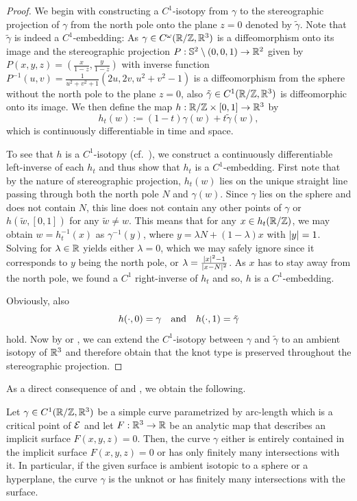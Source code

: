\begin{proof}
	We begin with constructing a $C^1$-isotopy from $\gamma$ to the stereographic projection of $\gamma$ from the north pole onto the plane $z=0$ denoted by $\tilde \gamma$. Note that $\tilde \gamma$ is indeed a $C^1$-embedding: As $\gamma\in C^\omega(\mathbb{R}/\mathbb{Z},\mathbb{R}^3)$ is a diffeomorphism onto its image and the stereographic projection $P:\mathbb S^2\setminus{(0,0,1)} \rightarrow \mathbb{R}^2$ given by $P(x,y,z)= (\frac{x}{1-z},\frac{y}{1-z})$ with inverse function $P^{-1}(u,v) = \tfrac{1}{u^2+v^2 +1}(2u,2v,u^2+v^2 -1)$ is a diffeomorphism from the sphere without the north pole to the plane $z=0$, also $\tilde \gamma \in C^1(\mathbb{R}/\mathbb{Z},\mathbb{R}^3)$ is diffeomorphic onto its image. We then define the map $h:\mathbb{R}/\mathbb{Z} \times [0,1]\rightarrow \mathbb{R}^3$ by
	\[
		h_t(w):=(1-t)\gamma(w) + t \tilde \gamma (w),
	\]
    which is continuously differentiable in time and space.
    
    To see that $h$ is a $C^1$-isotopy (cf.\ \cite[Section~8.1]{Hirsch:1976:DifferentialTopology}), we construct a continuously differentiable left-inverse of each $h_t$ and thus show that $h_t$ is a $C^1$-embedding.
    First note that by the nature of stereographic projection, $h_t(w)$ lies on the unique straight line passing through both the north pole $N$ and $\gamma(w)$.
    Since $\gamma$ lies on the sphere and does not contain $N$, this line does not contain any other points of $\gamma$ or $h(\tilde w,[0,1])$ for any $\tilde w \ne w$.
    This means that for any $x \in h_t(\mathbb{R}/\mathbb{Z})$, we may obtain $w=h_t^{-1}(x)$ as $\gamma^{-1}(y)$, where $y=\lambda N + (1-\lambda)x$ with $\lvert y\rvert=1$.
    Solving for $\lambda \in \mathbb{R}$ yields either $\lambda=0$, which we may safely ignore since it corresponds to $y$ being the north pole, or $\lambda=\frac {\lvert x\rvert^2-1} {\lvert x-N\rvert^2}$.
    As $x$ has to stay away from the north pole, we found a $C^1$ right-inverse of $h_t$ and so, $h$ is a $C^1$-embedding.
    
    Obviously, also 
	\[
		h(\cdot,0) = \gamma \quad \textnormal{and} \quad h(\cdot,1) = \tilde \gamma
	\]
	hold. Now by \cite[Section~8.1,~Exercise~4]{Hirsch:1976:DifferentialTopology} or \cite[Theorem~1.2]{Blatt:2009:NoteOnIsotopies}, we can extend the $C^1$-isotopy between $\gamma$ and $\tilde \gamma$ to an ambient isotopy of $\mathbb{R}^3$ and therefore obtain that the knot type is preserved throughout the stereographic projection.
\end{proof}

As a direct consequence of  and  , we obtain the following. 
\begin{corollary}
	Let $\gamma \in C^1(\mathbb{R}/\mathbb{Z},\mathbb{R}^3)$ be a simple curve parametrized by arc-length which is a critical point of $\mathcal{E}$ and let $F:\mathbb{R}^3 \rightarrow \mathbb{R}$ be an analytic map that describes an implicit surface $F(x,y,z)=0$.
	Then, the curve $\gamma$ either is entirely contained in the implicit surface $F(x,y,z)=0$ or has only finitely many intersections with it. In particular, if the given surface is ambient isotopic to a sphere or a hyperplane, the curve $\gamma$ is the unknot or has finitely many intersections with the surface.
\end{corollary}

